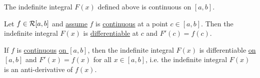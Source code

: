\documentclass[]{article}
\begin{document}
\begin{theorem}
	The indefinite integral $F(x)$ defined above is continuous on $[a,b]$.
\end{theorem}
\begin{theorem}
	 Let \ul{$f\in\mathcal{R}[a,b]$} and \ul{assume} \ul{$f$} is \ul{continuous} at a point $c\in[a,b]$. Then the indefinite integral $F(x)$ is \ul{differentiable} at $c$ and $F'(c) = f(c)$.
\end{theorem}
\begin{theorem}
	If \ul{$f$} is \ul{continuous} \ul{on $[a,b]$}, then the indefinite integral $F(x)$ is differentiable \ul{on $[a,b]$} and \ul{$F'(x) = f(x)$} for all $x\in[a,b]$, i.e. the indefinite integral $F(x)$ is an anti-derivative of $f(x)$.
\end{theorem}
\end{document}
